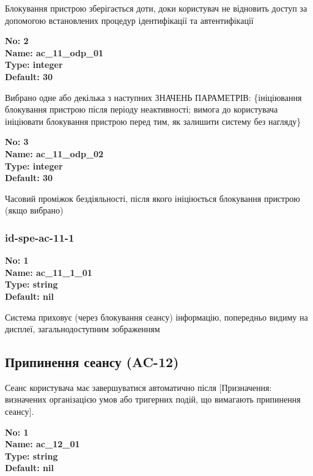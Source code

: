 \documentclass{article}
\begin{document}
{\footnotesize Блокування пристрою зберігається доти, доки користувач не відновить доступ за допомогою встановлених процедур ідентифікації та автентифікації}


{\footnotesize\bfseries
No: 2\\
Name: ac\_\allowbreak{}11\_\allowbreak{}odp\_\allowbreak{}01\\
Type: integer\\
Default: 30
}

{\footnotesize Вибрано одне або декілька з наступних ЗНАЧЕНЬ ПАРАМЕТРІВ: \{ініціювання блокування пристрою після періоду неактивності; вимога до користувача ініціювати блокування пристрою перед тим, як залишити систему без нагляду\}}


{\footnotesize\bfseries
No: 3\\
Name: ac\_\allowbreak{}11\_\allowbreak{}odp\_\allowbreak{}02\\
Type: integer\\
Default: 30
}

{\footnotesize Часовий проміжок бездіяльності, після якого ініціюється блокування пристрою (якщо вибрано)}




\subsubsection{id-spe-ac-11-1}


\vspace{10pt}
{\footnotesize\bfseries
No: 1\\
Name: ac\_\allowbreak{}11\_\allowbreak{}1\_\allowbreak{}01\\
Type: string\\
Default: nil
}

{\footnotesize Система приховує (через блокування сеансу) інформацію, попередньо видиму на дисплеї, загальнодоступним зображенням}




\subsection{Припинення сеансу (AC-12)}
Сеанс користувача має завершуватися автоматично після [Призначення: визначених організацією умов або тригерних подій, що вимагають припинення сеансу].

\vspace{10pt}
{\footnotesize\bfseries
No: 1\\
Name: ac\_\allowbreak{}12\_\allowbreak{}01\\
Type: string\\
Default: nil
}
\end{document}

